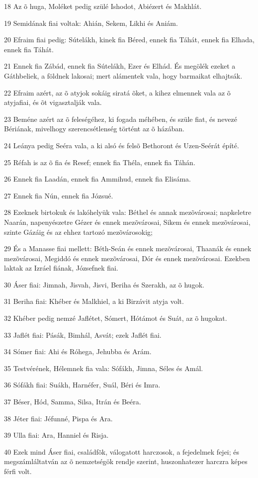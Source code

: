 \par 18 Az õ huga, Moléket pedig szülé Ishodot, Abiézert és Makhlát.
\par 19 Semidának fiai voltak: Ahián, Sekem, Likhi és Aniám.
\par 20 Efraim fiai pedig: Sútelákh, kinek fia Béred, ennek fia Táhát, ennek fia Elhada, ennek fia Táhát.
\par 21 Ennek fia Zábád, ennek fia Sútelákh, Ezer és Elhád. És megölék ezeket a Gáthbeliek, a földnek lakosai; mert alámentek vala, hogy barmaikat elhajtsák.
\par 22 Efraim azért, az õ atyjok sokáig siratá õket, a kihez elmennek vala az õ atyjafiai, és õt vigasztalják vala.
\par 23 Beméne azért az õ feleségéhez, ki fogada méhében, és szüle fiat, és nevezé Bériának, mivelhogy szerencsétlenség történt az õ házában.
\par 24 Leánya pedig Seéra vala, a ki alsó és felsõ Bethoront és Uzen-Seérát építé.
\par 25 Réfah is az õ fia és Resef; ennek fia Théla, ennek fia Táhán.
\par 26 Ennek fia Laadán, ennek fia Ammihud, ennek fia Elisáma.
\par 27 Ennek fia Nún, ennek fia Józsué.
\par 28 Ezeknek birtokuk és lakóhelyük vala: Béthel és annak mezõvárosai; napkeletre Naarán, napenyészetre Gézer és ennek mezõvárosai, Sikem és ennek mezõvárosai, szinte Gázáig és az ehhez tartozó mezõvárosokig;
\par 29 És a Manasse fiai mellett: Béth-Seán és ennek mezõvárosai, Thaanák és ennek mezõvárosai, Megiddó és ennek mezõvárosai, Dór és ennek mezõvárosai. Ezekben laktak az Izráel fiának, Józsefnek fiai.
\par 30 Áser fiai: Jimnah, Jisvah, Jisvi, Beriha és Szerakh, az õ hugok.
\par 31 Beriha fiai: Khéber és Malkhiel, a ki Birzávit atyja volt.
\par 32 Khéber pedig nemzé Jaflétet, Sómert, Hótámot és Suát, az õ hugokat.
\par 33 Jaflét fiai: Pásák, Bimhál, Asvát; ezek Jaflét fiai.
\par 34 Sómer fiai: Ahi és Róhega, Jehubba és Arám.
\par 35 Testvérének, Hélemnek fia vala: Sófákh, Jimna, Séles és Amál.
\par 36 Sófákh fiai: Suákh, Harnéfer, Suál, Béri és Imra.
\par 37 Béser, Hód, Samma, Silsa, Itrán és Beéra.
\par 38 Jéter fiai: Jéfunné, Pispa és Ara.
\par 39 Ulla fiai: Ara, Hanniel és Risja.
\par 40 Ezek mind Áser fiai, családfõk, válogatott harczosok, a fejedelmek fejei; és megszámláltatván az õ nemzetségök rendje szerint, huszonhatezer harczra képes férfi volt.

